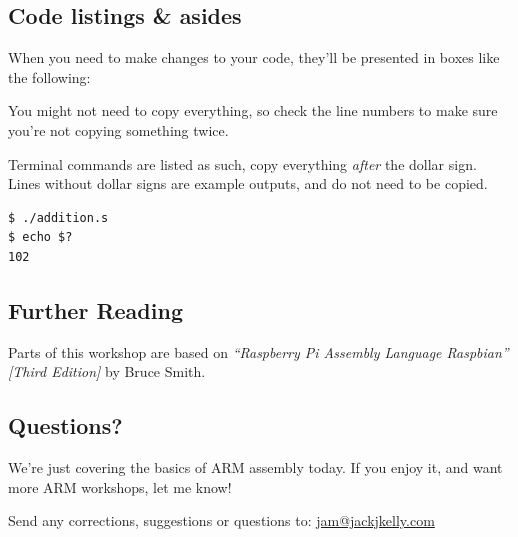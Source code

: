 \documentclass[a4paper, twocolumn, twoside, 11pt]{article}
\newenvironment{aside}
		{
		\begin{mdframed}[
			style=0,%
			leftline=false,
			rightline=false,
			innerbottommargin=2pt,
			innerleftmargin=12pt,
			innerrightmargin=0pt,
			linewidth=0.75pt,
			skipabove=6pt,
			skipbelow=6pt
			]
				\small
				\color{JungleGreen}
				\setlength{\parskip}{2pt}
				\vspace{2pt} %
		}
		{
		\end{mdframed}
		}
\begin{document}
		\subsection*{Code listings \& asides}
	
			When you need to make changes to your code, they'll be presented in boxes like the following:

			
	
			You might not need to copy everything, so check the line numbers to make sure you're not copying something twice.
			
			Terminal commands are listed as such, copy everything \textit{after} the dollar sign. Lines without dollar signs are example outputs, and do not need to be copied.
			
			\begin{lstlisting}
$ ./addition.s
$ echo $?
102
			\end{lstlisting}
	
	
			
		\subsection*{Further Reading}
			
			Parts of this workshop are based on \textit{``Raspberry Pi Assembly Language Raspbian'' [Third Edition]} by Bruce Smith.
		
		\subsection*{Questions?}
		
			We're just covering the basics of ARM assembly today. If you enjoy it, and want more ARM workshops, let me know!
	
			Send any corrections, suggestions or questions to:
			\url{jam@jackjkelly.com}\label{email}
		
\end{document}
